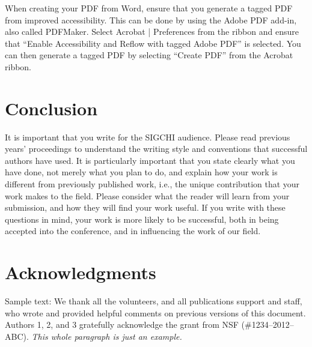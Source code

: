 \documentclass{sigchi}
\begin{document}
When creating your PDF from Word, ensure that you generate a tagged
PDF from improved accessibility. This can be done by using the Adobe
PDF add-in, also called PDFMaker. Select Acrobat | Preferences from
the ribbon and ensure that ``Enable Accessibility and Reflow with
tagged Adobe PDF'' is selected. You can then generate a tagged PDF by
selecting ``Create PDF'' from the Acrobat ribbon.

\section{Conclusion}

It is important that you write for the SIGCHI audience. Please read
previous years’ proceedings to understand the writing style and
conventions that successful authors have used. It is particularly
important that you state clearly what you have done, not merely what
you plan to do, and explain how your work is different from previously
published work, i.e., the unique contribution that your work makes to
the field. Please consider what the reader will learn from your
submission, and how they will find your work useful. If you write with
these questions in mind, your work is more likely to be successful,
both in being accepted into the conference, and in influencing the
work of our field.

\section{Acknowledgments}

Sample text: We thank all the volunteers, and all publications support
and staff, who wrote and provided helpful comments on previous
versions of this document. Authors 1, 2, and 3 gratefully acknowledge
the grant from NSF (\#1234--2012--ABC). \textit{This whole paragraph is
  just an example.}

%
%
%
%
%
\balance{}
\end{document}

